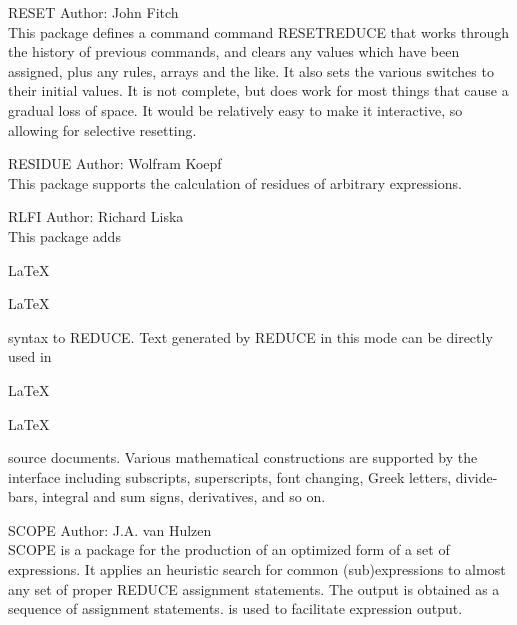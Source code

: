 \begin{Package}{RESET}
Author: John Fitch\\

This package defines a command command RESETREDUCE that works through the
history of previous commands, and clears any values which have been
assigned, plus any rules, arrays and the like.  It also sets the various
switches to their initial values.  It is not complete, but does work for
most things that cause a gradual loss of space.  It would be relatively
easy to make it interactive, so allowing for selective resetting.
\end{Package}

\begin{Package}{RESIDUE}
Author: Wolfram Koepf\\

This package supports the calculation of residues of arbitrary
expressions.
\end{Package}

\begin{Package}{RLFI}
Author: Richard Liska\\

This package
adds \begin{TEX}\LaTeX \end{TEX}\begin{INFO}LaTeX \end{INFO} syntax
to REDUCE.  Text generated by REDUCE in this mode can be directly
used in \begin{TEX}\LaTeX \end{TEX} \begin{INFO}LaTeX \end{INFO} source
documents.  Various
mathematical constructions are supported by the interface including
subscripts, superscripts, font changing, Greek letters, divide-bars,
integral and sum signs, derivatives, and so on.
\end{Package}

\begin{Package}{SCOPE}
Author: J.A. van Hulzen\\

SCOPE is a package for the production of an optimized form of a set of
expressions.  It applies an heuristic search for common (sub)expressions
to almost any set of proper REDUCE assignment statements.  The output is
obtained as a sequence of assignment statements.   is used to
facilitate expression output.
\end{Package}

